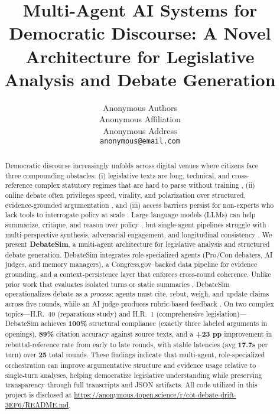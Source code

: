 \documentclass{article}
\title{Multi-Agent AI Systems for Democratic Discourse: A Novel Architecture for Legislative Analysis and Debate Generation}
\author{%
  Anonymous Authors \\
  Anonymous Affiliation \\
  Anonymous Address \\
  \texttt{anonymous@email.com} \\
}
\begin{document}
\maketitle

\begin{abstract}
Democratic discourse increasingly unfolds across digital venues where citizens face three compounding obstacles: (i) legislative texts are long, technical, and cross-reference complex statutory regimes that are hard to parse without training \citep{Kornilova2019BillSum,LegalBench2023}, (ii) online debate often privileges speed, virality, and polarization over structured, evidence-grounded argumentation \citep{Allen2020FakeNews,Bail2020PrismBook}, and (iii) access barriers persist for non-experts who lack tools to interrogate policy at scale \citep{Wang2023AIpolicyReview}. Large language models (LLMs) can help summarize, critique, and reason over policy \citep{Zhang2024CollaborativeSynthesis,Johnson2023AutomatedLegis}, but single-agent pipelines struggle with multi-perspective synthesis, adversarial engagement, and longitudinal consistency \citep{Irving2018AISafetyDebate,Li2023CAMEL}. We present \textbf{DebateSim}, a multi-agent architecture for legislative analysis and structured debate generation. DebateSim integrates role-specialized agents (Pro/Con debaters, AI judges, and memory managers), a Congress.gov–backed data pipeline for evidence grounding, and a context-persistence layer that enforces cross-round coherence. Unlike prior work that evaluates isolated turns or static summaries \citep{Kornilova2019BillSum,LegalBench2023}, DebateSim operationalizes debate as a \emph{process}: agents must cite, rebut, weigh, and update claims across five rounds, while an AI judge produces rubric-based feedback \citep{Zheng2023JudgingLLMs,Bai2022ConstitutionalAI}. On two complex topics—H.R.~40 (reparations study) and H.R.~1 (comprehensive legislation)—DebateSim achieves \textbf{100\%} structural compliance (exactly three labeled arguments in openings), \textbf{89\%} citation accuracy against source texts, and a \textbf{+23 pp} improvement in rebuttal-reference rate from early to late rounds, with stable latencies (avg \textbf{17.7s} per turn) over \textbf{25} total rounds. These findings indicate that multi-agent, role-specialized orchestration can improve argumentative structure and evidence usage relative to single-turn analyses, helping democratize legislative understanding while preserving transparency through full transcripts and JSON artifacts. All code utilized in this project is disclosed at \url{https://anonymous.4open.science/r/cot-debate-drift-3EF6/README.md}.
\end{abstract}
\end{document}
